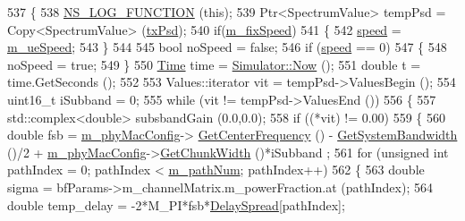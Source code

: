 \begin{DoxyCode}
537 \{
538         \hyperlink{log-macros-disabled_8h_a90b90d5bad1f39cb1b64923ea94c0761}{NS\_LOG\_FUNCTION} (\textcolor{keyword}{this});
539         Ptr<SpectrumValue> tempPsd = Copy<SpectrumValue> (\hyperlink{lte__link__budget_8m_a684fe3101a5e48a5fcc57cab8dbcd1aa}{txPsd});
540         \textcolor{keywordflow}{if}(\hyperlink{classns3_1_1MmWaveBeamforming_aa083011423cd8a3c1077725af8bb7de0}{m\_fixSpeed})
541         \{
542                 \hyperlink{mmwave-amc-test_8cc_a6dc6e6f3c75c509ce943163afb5dade7}{speed} = \hyperlink{classns3_1_1MmWaveBeamforming_a11796c9c9b2df2d24fe99e7e5817cd20}{m\_ueSpeed};
543         \}
544 
545         \textcolor{keywordtype}{bool} noSpeed = \textcolor{keyword}{false};
546         \textcolor{keywordflow}{if} (\hyperlink{mmwave-amc-test_8cc_a6dc6e6f3c75c509ce943163afb5dade7}{speed} == 0)
547         \{
548                 noSpeed = \textcolor{keyword}{true};
549         \}
550         \hyperlink{namespacens3_1_1TracedValueCallback_a7ffd3e7c142ffe7c8a1d2db9b8de38ec}{Time} time = \hyperlink{classns3_1_1Simulator_ac3178fa975b419f7875e7105be122800}{Simulator::Now} ();
551         \textcolor{keywordtype}{double} t = time.GetSeconds ();
552 
553         Values::iterator vit = tempPsd->ValuesBegin ();
554         uint16\_t iSubband = 0;
555         \textcolor{keywordflow}{while} (vit != tempPsd->ValuesEnd ())
556         \{
557                 std::complex<double> subsbandGain (0.0,0.0);
558                 \textcolor{keywordflow}{if} ((*vit) != 0.00)
559                 \{
560                         \textcolor{keywordtype}{double} fsb = \hyperlink{classns3_1_1MmWaveBeamforming_a8984cd1f9d9597c3b555bfa98daad906}{m\_phyMacConfig}->
      \hyperlink{classns3_1_1MmWavePhyMacCommon_a0850d2e37c7075b9bce242723b722019}{GetCenterFrequency} () - \hyperlink{classns3_1_1MmWaveBeamforming_a5dda4b699d52f4899e145b8dcd23d951}{GetSystemBandwidth} ()/2 + 
      \hyperlink{classns3_1_1MmWaveBeamforming_a8984cd1f9d9597c3b555bfa98daad906}{m\_phyMacConfig}->\hyperlink{classns3_1_1MmWavePhyMacCommon_acc801566d527f1893d67a618ea3be203}{GetChunkWidth} ()*iSubband ;
561                         \textcolor{keywordflow}{for} (\textcolor{keywordtype}{unsigned} \textcolor{keywordtype}{int} pathIndex = 0; pathIndex < \hyperlink{classns3_1_1MmWaveBeamforming_a4aeb1eea76b6ba2be91c411494b4c573}{m\_pathNum}; pathIndex++)
562                         \{
563                                 \textcolor{keywordtype}{double} sigma = bfParams->m\_channelMatrix.m\_powerFraction.at (pathIndex);
564                                 \textcolor{keywordtype}{double} temp\_delay = -2*M\_PI*fsb*\hyperlink{namespacens3_afee438cc28b5157f0eae04be102e5622}{DelaySpread}[pathIndex];

\end{DoxyCode}

